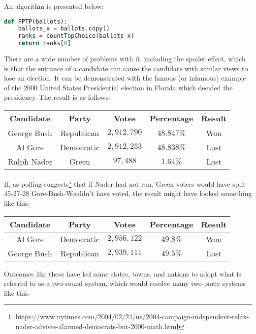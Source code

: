 \documentclass{article}
\begin{document}
An algorithm is presented below:
\begin{lstlisting}[language = Python]
def FPTP(ballots):
    ballots_x = ballots.copy()
    ranks = countTopChoice(ballots_x)
    return ranks[0]
\end{lstlisting}

There are a wide number of problems with it, including the spoiler effect, which is that the entrance of a candidate can cause the candidate with similar views to lose an election. It can be demonstrated with the famous (or infamous) example of the 2000 United States Presidential election in Florida which decided the presidency. The result is as follows:

\begin{table}[H]\centering
\begin{tabular}{|c|c|c|c|c|}
\hline\rowcolor{headc}
Candidate & Party & Votes & Percentage & Result\\
\hline\rowcolor{advc}
George Bush & Republican & $2,912,790$ & $48.847\%$ & Won \\
\hline
Al Gore & Democratic & $2,912,253$ & $48.838\%$ & Lost \\
\hline 
Ralph Nader & Green & $97,488$ & $1.64\%$ & Lost \\
\hline
\end{tabular}
\label{2000fptp}
\end{table}

If, as polling suggests\footnote{https://www.nytimes.com/2004/02/24/us/2004-campaign-independent-relax-nader-advises-alarmed-democrats-but-2000-math.html} that if Nader had not run, Green voters would have split 45-27-28 Gore-Bush-Wouldn't have voted, the result might have looked something like this:

\begin{table}[H]\centering
\begin{tabular}{|c|c|c|c|c|}
\hline\rowcolor{headc}
Candidate & Party & Votes & Percentage & Result\\
\hline\rowcolor{advc}
Al Gore & Democratic & $2,956,122$ & $49.8\%$ & Won \\
\hline
George Bush & Republican & $2,939,111$ & $49.5\%$ & Lost \\
\hline
\end{tabular}
\end{table}

Outcomes like these have led some states, towns, and nations to adopt what is referred to as a two-round system, which would resolve many two party systems like this.
\end{document}
